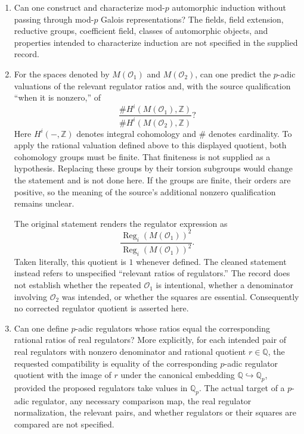 \documentclass[11pt]{article}
\newcommand{\Z}{\mathbb{Z}}
\newcommand{\Q}{\mathbb{Q}}
\begin{document}
\begin{enumerate}
\item Can one construct and characterize mod-\(p\) automorphic induction without passing through mod-\(p\) Galois representations? The fields, field extension, reductive groups, coefficient field, classes of automorphic objects, and properties intended to characterize induction are not specified in the supplied record.
\item For the spaces denoted by \(M(\mathcal O_1)\) and \(M(\mathcal O_2)\), can one predict the \(p\)-adic valuations of the relevant regulator ratios and, with the source qualification ``when it is nonzero,'' of
\[
\frac{\#H^i(M(\mathcal O_1),\Z)}{\#H^i(M(\mathcal O_2),\Z)}?
\]
Here \(H^i(-,\Z)\) denotes integral cohomology and \(\#\) denotes cardinality. To apply the rational valuation defined above to this displayed quotient, both cohomology groups must be finite. That finiteness is not supplied as a hypothesis. Replacing these groups by their torsion subgroups would change the statement and is not done here. If the groups are finite, their orders are positive, so the meaning of the source's additional nonzero qualification remains unclear.

The original statement renders the regulator expression as
\[
\frac{\operatorname{Reg}_i(M(\mathcal O_1))^2}{\operatorname{Reg}_i(M(\mathcal O_1))^2}.
\]
Taken literally, this quotient is \(1\) whenever defined. The cleaned statement instead refers to unspecified ``relevant ratios of regulators.'' The record does not establish whether the repeated \(\mathcal O_1\) is intentional, whether a denominator involving \(\mathcal O_2\) was intended, or whether the squares are essential. Consequently no corrected regulator quotient is asserted here.
\item Can one define \(p\)-adic regulators whose ratios equal the corresponding rational ratios of real regulators? More explicitly, for each intended pair of real regulators with nonzero denominator and rational quotient \(r\in\Q\), the requested compatibility is equality of the corresponding \(p\)-adic regulator quotient with the image of \(r\) under the canonical embedding \(\Q\hookrightarrow\Q_p\), provided the proposed regulators take values in \(\Q_p\). The actual target of a \(p\)-adic regulator, any necessary comparison map, the real regulator normalization, the relevant pairs, and whether regulators or their squares are compared are not specified.
\end{enumerate}
\end{document}

